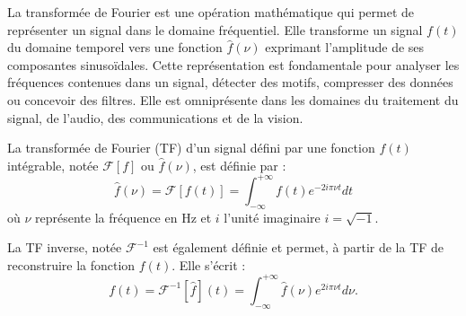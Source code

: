 La transformée de Fourier est une opération mathématique qui permet de représenter un signal dans le domaine fréquentiel. Elle transforme un signal $f(t)$ du domaine temporel vers une fonction $\hat{f}(\nu)$ exprimant l'amplitude de ses composantes sinusoïdales. Cette représentation est fondamentale pour analyser les fréquences contenues dans un signal, détecter des motifs, compresser des données ou concevoir des filtres. Elle est omniprésente dans les domaines du traitement du signal, de l'audio, des communications et de la vision.

La transformée de Fourier (TF) d'un signal défini par une fonction $f(t)$ intégrable, notée $\mathcal{F}[f]$ ou $\hat{f}(\nu)$, est définie par :
\begin{equation}
\hat{f}(\nu) = \mathcal{F}[f(t)] = \int_{-\infty}^{+\infty} f(t) e^{-2i\pi\nu t} dt
\end{equation}
où $\nu$ représente la fréquence en Hz et $i$ l'unité imaginaire $i=\sqrt{-1}$.

La TF inverse, notée $\mathcal{F}^{-1}$ est également définie et permet, à partir de la TF de reconstruire la fonction $f(t)$. Elle s'écrit :
\begin{equation}
f(t) = \mathcal{F}^{-1}[\hat{f}](t) = \int_{-\infty}^{+\infty} \hat{f}(\nu) e^{2i\pi\nu t} d\nu.
\end{equation}



